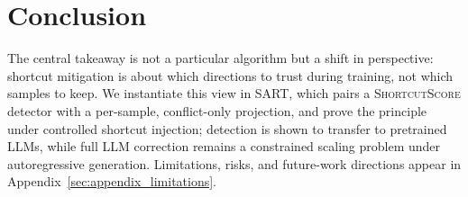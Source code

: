 \section{Conclusion}
\label{sec:conclusion}

The central takeaway is not a particular algorithm but a shift in perspective: shortcut mitigation is about which directions to trust during training, not which samples to keep. We instantiate this view in SART, which pairs a \textsc{ShortcutScore} detector with a per-sample, conflict-only projection, and prove the principle under controlled shortcut injection; detection is shown to transfer to pretrained LLMs, while full LLM correction remains a constrained scaling problem under autoregressive generation. Limitations, risks, and future-work directions appear in Appendix~\ref{sec:appendix_limitations}.
